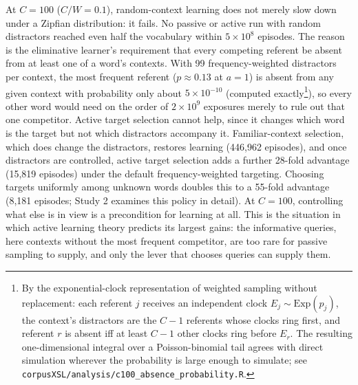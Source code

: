 \documentclass[a4paper,natbib,man]{apa6}
\begin{document}
At $C=100$ ($C/W=0.1$), random-context learning does not merely slow down under a Zipfian distribution: it fails. No passive or active run with random distractors reached even half the vocabulary within $5 \times 10^8$ episodes. The reason is the eliminative learner's requirement that every competing referent be absent from at least one of a word's contexts. With 99 frequency-weighted distractors per context, the most frequent referent ($p \approx 0.13$ at $a=1$) is absent from any given context with probability only about $5 \times 10^{-10}$ (computed exactly\footnote{By the exponential-clock representation of weighted sampling without replacement: each referent $j$ receives an independent clock $E_j \sim \mathrm{Exp}(p_j)$, the context's distractors are the $C-1$ referents whose clocks ring first, and referent $r$ is absent iff at least $C-1$ other clocks ring before $E_r$. The resulting one-dimensional integral over a Poisson-binomial tail agrees with direct simulation wherever the probability is large enough to simulate; see \texttt{corpusXSL/analysis/c100\_absence\_probability.R}.}), so every other word would need on the order of $2 \times 10^9$ exposures merely to rule out that one competitor. Active target selection cannot help, since it changes which word is the target but not which distractors accompany it. Familiar-context selection, which does change the distractors, restores learning (446,962 episodes), and once distractors are controlled, active target selection adds a further 28-fold advantage (15,819 episodes) under the default frequency-weighted targeting. Choosing targets uniformly among unknown words doubles this to a 55-fold advantage (8,181 episodes; Study 2 examines this policy in detail). At $C=100$, controlling what else is in view is a precondition for learning at all. This is the situation in which active learning theory predicts its largest gains: the informative queries, here contexts without the most frequent competitor, are too rare for passive sampling to supply, and only the lever that chooses queries can supply them.
\end{document}
